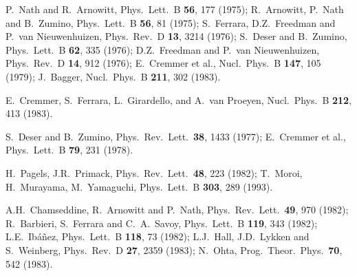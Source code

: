 \documentclass[12pt]{article}
\begin{document}
\begin{thebibliography}{999}
P.~Nath and R.~Arnowitt,
  Phys.\ Lett.\ B {\bf 56}, 177 (1975);
R.~Arnowitt, P.~Nath and B.~Zumino,
  Phys.\ Lett.\ B {\bf 56}, 81 (1975);
S.~Ferrara, D.Z.~Freedman and P.~van Nieuwenhuizen,
  Phys.\ Rev.\ D {\bf 13}, 3214 (1976);
S.~Deser and B.~Zumino,
  Phys.\ Lett.\ B {\bf 62}, 335 (1976);
D.Z.~Freedman and  P.~van Nieuwenhuizen, 
  Phys.\ Rev.\ D {\bf 14}, 912 (1976);
E.~Cremmer et al.,
  Nucl.\ Phys.\ B {\bf 147}, 105 (1979);
J.~Bagger, 
  Nucl.\ Phys.\ B {\bf 211}, 302 (1983).

E.~Cremmer, S.~Ferrara, L.~Girardello, and A.~van Proeyen,
  Nucl.\ Phys.\ B {\bf 212}, 413 (1983).

S.~Deser and B.~Zumino,
  Phys.\ Rev.\ Lett.\  {\bf 38}, 1433 (1977);
E.~Cremmer et al.,
  Phys.\ Lett.\ B {\bf 79}, 231 (1978).

H.~Pagels, J.R.~Primack, 
  Phys.\ Rev.\ Lett.\  {\bf 48}, 223 (1982);
T.~Moroi, H.~Murayama, M.~Yamaguchi, 
  Phys.\ Lett.\ B {\bf 303}, 289 (1993).

  A.H.~Chamseddine, R.~Arnowitt and P.~Nath,
  Phys.\ Rev.\ Lett.\  {\bf 49}, 970 (1982);
  R.~Barbieri, S.~Ferrara and C.~A.~Savoy,
  Phys.\ Lett.\ B {\bf 119}, 343 (1982);
  L.E.~Ib\'a\~nez, 
  Phys.\ Lett.\ B {\bf 118}, 73 (1982);
  L.J.~Hall, J.D.~Lykken and S.~Weinberg, 
  Phys.\ Rev.\ D {\bf 27}, 2359 (1983);
  N.~Ohta,
  Prog.\ Theor.\ Phys.\  {\bf 70}, 542 (1983).


\end{thebibliography}
\end{document}
